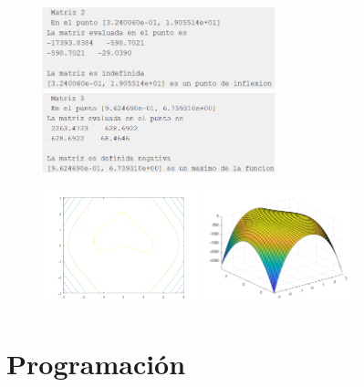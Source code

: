 \documentclass[12pt]{article}
\begin{document}
\begin{enumerate}
\begin{figure}[H]
        \includegraphics[width = 0.6\textwidth]{3-2.png}
        \includegraphics[width = 0.6\textwidth]{3-3.png}
    \end{figure}
    \begin{figure}[H]
        \centering
        \includegraphics[width = 0.4\textwidth]{3-4.png}
        \includegraphics[width = 0.4\textwidth]{3-5.png}
    \end{figure}
\end{enumerate}

\newpage

\section*{Programación}
\end{document}
